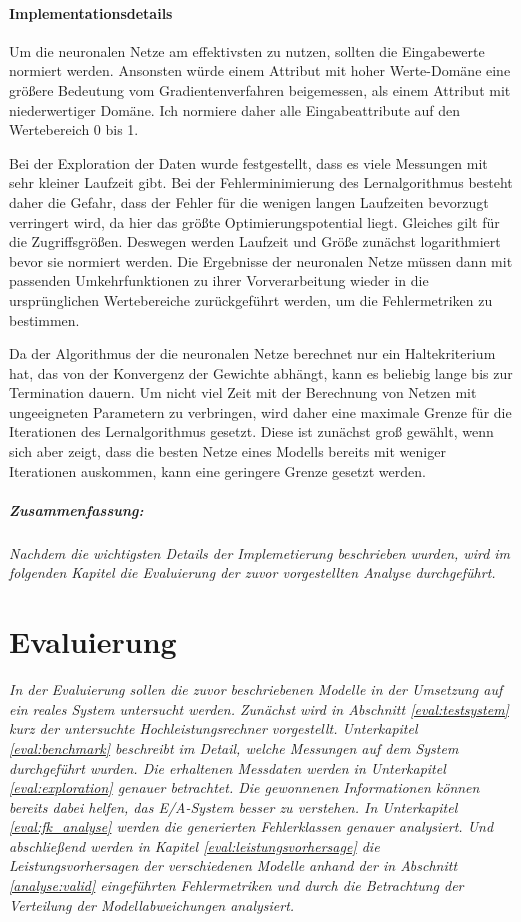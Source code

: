 \documentclass[
	12pt,
	a4paper,
	BCOR10mm,
	DIV14,
	listof=totoc,
	bibliography=totoc,
	headsepline
]{scrreprt}
\begin{document}
\subsubsection{Implementationsdetails}
Um die neuronalen Netze am effektivsten zu nutzen, sollten die Eingabewerte normiert werden. Ansonsten würde einem Attribut mit hoher Werte-Domäne eine größere Bedeutung vom Gradientenverfahren beigemessen, als einem Attribut mit niederwertiger Domäne. 
Ich normiere daher alle Eingabeattribute auf den Wertebereich 0 bis 1.\medskip

Bei der Exploration der Daten wurde festgestellt, dass es viele Messungen mit sehr kleiner Laufzeit gibt.
Bei der Fehlerminimierung des Lernalgorithmus besteht daher die Gefahr, dass der Fehler für die wenigen langen Laufzeiten bevorzugt verringert wird, da hier das größte Optimierungspotential liegt. Gleiches gilt für die Zugriffsgrößen.
Deswegen werden Laufzeit und Größe zunächst logarithmiert bevor sie normiert werden.
Die Ergebnisse der neuronalen Netze müssen dann mit passenden Umkehrfunktionen zu ihrer Vorverarbeitung wieder in die ursprünglichen Wertebereiche zurückgeführt werden, um die Fehlermetriken zu bestimmen.\medskip

Da der Algorithmus der die neuronalen Netze berechnet nur ein Haltekriterium hat, das von der Konvergenz der Gewichte abhängt, kann es beliebig lange bis zur Termination dauern.
Um nicht viel Zeit mit der Berechnung von Netzen mit ungeeigneten Parametern zu verbringen, wird daher eine maximale Grenze für die Iterationen des Lernalgorithmus gesetzt. Diese ist zunächst groß gewählt, wenn sich aber zeigt, dass die besten Netze eines Modells bereits mit weniger Iterationen auskommen, kann eine geringere Grenze gesetzt werden.

\paragraph{Zusammenfassung:}
\textit{
	Nachdem die wichtigsten Details der Implemetierung beschrieben wurden, wird im folgenden Kapitel die Evaluierung der zuvor vorgestellten Analyse durchgeführt.
}

\chapter{Evaluierung}
\label{eval}
\textit{%
	In der Evaluierung sollen die zuvor beschriebenen Modelle in der Umsetzung auf ein reales System untersucht werden.
	Zunächst wird in Abschnitt \ref{eval:testsystem} kurz der untersuchte Hochleistungsrechner vorgestellt.	
	Unterkapitel \ref{eval:benchmark} beschreibt im Detail, welche Messungen auf dem System durchgeführt wurden.
	Die erhaltenen Messdaten werden in Unterkapitel \ref{eval:exploration} genauer betrachtet. Die gewonnenen Informationen können bereits dabei helfen, das E/A-System besser zu verstehen.
	In Unterkapitel \ref{eval:fk_analyse} werden die generierten Fehlerklassen genauer analysiert.
	Und abschließend werden in Kapitel \ref{eval:leistungsvorhersage} die Leistungsvorhersagen der verschiedenen Modelle anhand der in Abschnitt \ref{analyse:valid} eingeführten Fehlermetriken und durch die Betrachtung der Verteilung der Modellabweichungen analysiert.
}
\bigskip
\end{document}
